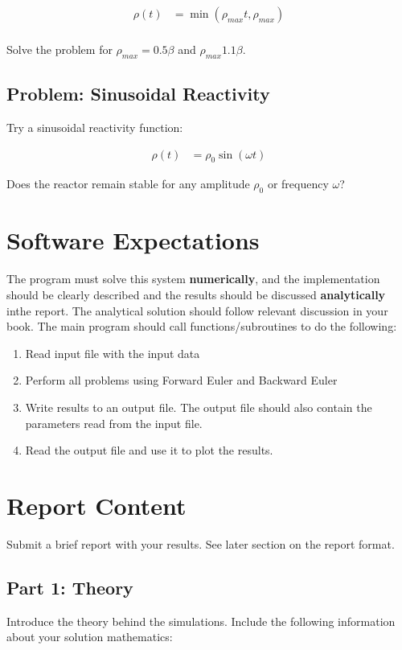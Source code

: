\documentclass{article}
\begin{document}
\begin{align}
        \rho(t) &= \min(\rho_{max}t, \rho_{max})\\
\end{align}

Solve the problem for $\rho_{max} = 0.5\beta$ and $\rho_{max} 1.1\beta$.


\subsection{Problem: Sinusoidal Reactivity}

Try a sinusoidal reactivity function:

\begin{align}
        \rho(t) &= \rho_0 \sin{(\omega t)}
\end{align}

Does the reactor remain stable for any amplitude $\rho_0$ or frequency 
$\omega$?

\section{Software Expectations}

The program must solve this system \textbf{numerically}, and the 
implementation should be clearly described and the results should be discussed 
\textbf{analytically} inthe report.  The analytical solution 
should follow relevant discussion in your book.  The main program should 
call functions/subroutines to do the following:

\begin{enumerate}
        \item Read input file with the input data
        \item Perform all problems using Forward Euler and Backward Euler
        \item Write results to an output file.  The output file should also 
                contain the parameters read from the input file.
        \item Read the output file and use it to plot the results.
\end{enumerate}

\section{Report Content}
Submit a brief report with your results. 
See later section on the report format.

\subsection{Part 1: Theory}
Introduce the theory behind the simulations. Include the following information 
about your solution mathematics:
\end{document}
